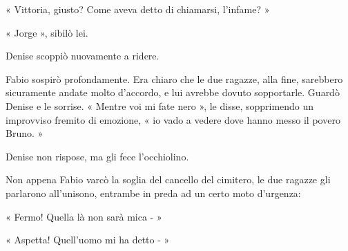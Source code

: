 « Vittoria, giusto? Come aveva detto di chiamarsi, l'infame? »

« Jorge », sibilò lei.

Denise scoppiò nuovamente a ridere.

Fabio sospirò profondamente. Era chiaro che le due ragazze, alla fine, sarebbero sicuramente andate molto d'accordo, e lui avrebbe dovuto sopportarle. Guardò Denise e le sorrise. « Mentre voi mi fate nero », le disse, sopprimendo un improvviso fremito di emozione, « io vado a vedere dove hanno messo il povero Bruno. »

Denise non rispose, ma gli fece l'occhiolino.

Non appena Fabio varcò la soglia del cancello del cimitero, le due ragazze gli parlarono all'unisono, entrambe in preda ad un certo moto d'urgenza:

« Fermo! Quella là non sarà mica - »

« Aspetta! Quell'uomo mi ha detto - »
